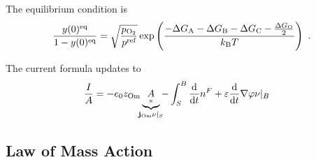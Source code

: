 \documentclass{article}
\numberwithin{equation}{section}
\newcommand{\us}[1]{\underset{\textrm{s}}{#1}{}}
\def\kB{k_\mathrm{B}}
\def\Om{\mathrm{Om}}
\newcommand{\OO}{{\ce{O2}}}
\newcommand{\dd}{{\mathrm{d}}}
\def\y0{y(0)}
\def\DGA{\Delta G_\textrm{A}  }
\def\DGB{\Delta G_\textrm{B}  }
\def\DGC{\Delta G_\textrm{C}  }
\def\DGO{\Delta G_\textrm{O}  }
\def\eq{\textrm{eq}}
\def\REF{\textrm{ref}}
\begin{document}
The equilibrium condition is
\begin{subequations}
\begin{align}
    \frac{\y0^\eq}{1-\y0^\eq} = \sqrt{\frac{p_\OO}{p^\REF}} \exp
\left(
	\frac{-\DGA - \DGB - \DGC - \frac{\DGO}{2}}{\kB T}
\right)~.
\end{align}
\end{subequations}

The current formula updates to
\begin{align}
    \frac{I}{A} &= - e_0  z_\Om \underbrace{\us A}_{\mathclap{\mathbf{j}_\Om\nu|_S}}
                     - \int_S^B \frac{\dd}{\dd t} n^F
                     +\varepsilon\frac{\dd}{\dd t}\nabla\varphi\nu|_B 
    \label{}
\end{align}
\subsection{Law of Mass Action}
\end{document}
